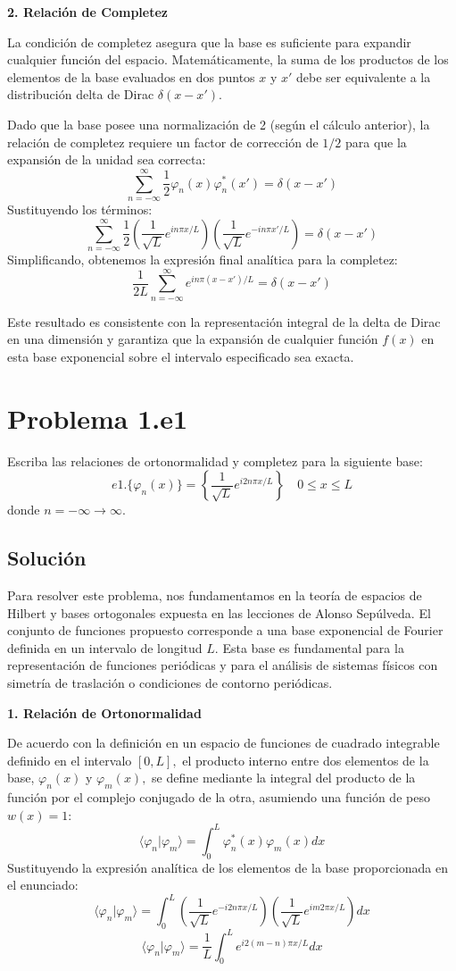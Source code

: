 \documentclass[a4paper]{article}
\begin{document}
\textbf{2. Relación de Completez}

La condición de completez asegura que la base es suficiente para expandir cualquier función del espacio. Matemáticamente, la suma de los productos de los elementos de la base evaluados en dos puntos $x$ y $x'$ debe ser equivalente a la distribución delta de Dirac $\delta(x - x').$ 

Dado que la base posee una normalización de 2 (según el cálculo anterior), la relación de completez requiere un factor de corrección de $1/2$ para que la expansión de la unidad sea correcta:
$$ \sum_{n=-\infty}^{\infty} \frac{1}{2} \varphi_n(x) \varphi_n^*(x') = \delta(x - x') $$
Sustituyendo los términos:
$$ \sum_{n=-\infty}^{\infty} \frac{1}{2} \left( \frac{1}{\sqrt{L}} e^{in\pi x / L} \right) \left( \frac{1}{\sqrt{L}} e^{-in\pi x' / L} \right) = \delta(x - x') $$
Simplificando, obtenemos la expresión final analítica para la completez:
$$ \frac{1}{2L} \sum_{n=-\infty}^{\infty} e^{in\pi(x - x')/L} = \delta(x - x') $$

Este resultado es consistente con la representación integral de la delta de Dirac en una dimensión y garantiza que la expansión de cualquier función $f(x)$ en esta base exponencial sobre el intervalo especificado sea exacta.


\section{Problema 1.e1}
Escriba las relaciones de ortonormalidad y completez para la siguiente base:
$$ e1. \{\varphi_n(x)\} = \left\{\frac{1}{\sqrt{L}} e^{i2n\pi x/L}\right\} \quad 0 \leq x \leq L $$
donde $n = -\infty \to \infty.$

\subsection{Solución}

Para resolver este problema, nos fundamentamos en la teoría de espacios de Hilbert y bases ortogonales expuesta en las lecciones de Alonso Sepúlveda. El conjunto de funciones propuesto corresponde a una base exponencial de Fourier definida en un intervalo de longitud $L.$ Esta base es fundamental para la representación de funciones periódicas y para el análisis de sistemas físicos con simetría de traslación o condiciones de contorno periódicas.

\textbf{1. Relación de Ortonormalidad}

De acuerdo con la definición en un espacio de funciones de cuadrado integrable definido en el intervalo $[0, L],$ el producto interno entre dos elementos de la base, $\varphi_n(x)$ y $\varphi_m(x),$ se define mediante la integral del producto de la función por el complejo conjugado de la otra, asumiendo una función de peso $w(x) = 1$:
$$ \langle \varphi_n | \varphi_m \rangle = \int_{0}^{L} \varphi_n^*(x) \varphi_m(x) dx $$
Sustituyendo la expresión analítica de los elementos de la base proporcionada en el enunciado:
$$ \langle \varphi_n | \varphi_m \rangle = \int_{0}^{L} \left( \frac{1}{\sqrt{L}} e^{-i2n\pi x / L} \right) \left( \frac{1}{\sqrt{L}} e^{im2\pi x / L} \right) dx $$
$$ \langle \varphi_n | \varphi_m \rangle = \frac{1}{L} \int_{0}^{L} e^{i2(m-n)\pi x / L} dx $$
\end{document}
